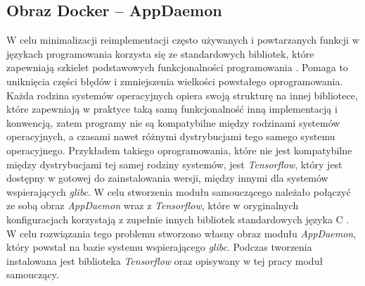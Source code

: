 \subsection{Obraz Docker -- AppDaemon}
W celu minimalizacji reimplementacji często używanych i powtarzanych funkcji w językach programowania korzysta się ze standardowych bibliotek, które zapewniają szkielet podstawowych funkcjonalności programowania \cite{book:cstdl}. Pomaga to uniknięcia części błędów i zmniejszenia wielkości powstałego oprogramowania. Każda rodzina systemów operacyjnych opiera swoją strukturę na innej bibliotece, które zapewniają w praktyce taką samą funkcjonalność inną implementacją i konwencją, zatem programy nie są kompatybilne między rodzinami systemów operacyjnych, a czasami nawet różnymi dystrybucjami tego samego systemu operacyjnego. Przykładem takiego oprogramowania, które nie jest kompatybilne między dystrybucjami tej samej rodziny systemów, jest \textit{Tensorflow}, który jest dostępny w gotowej do zainstalowania wersji, między innymi dla systemów wspierających \textit{glibc}. W celu stworzenia modułu samouczącego należało połączyć ze sobą obraz \textit{AppDaemon} wraz z \textit{Tensorflow}, które w oryginalnych konfiguracjach korzystają z zupełnie innych bibliotek standardowych języka C \cite{page:alpine_linux} \cite{page:ad_dockerfile}. W celu rozwiązania tego problemu stworzono własny obraz modułu \textit{AppDaemon}, który powstał na bazie systemu wspierającego \textit{glibc}. Podczas tworzenia instalowana jest biblioteka \textit{Tensorflow} oraz opisywany w tej pracy moduł samouczący.



